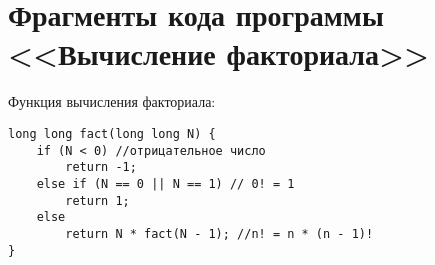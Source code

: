 \appendix
\section{Фрагменты кода программы <<Вычисление факториала>>}
\label{app:factorial}
Функция вычисления факториала:

\begin{verbatim}
long long fact(long long N) {
	if (N < 0) //отрицательное число
		return -1;
	else if (N == 0 || N == 1) // 0! = 1
		return 1;
	else
		return N * fact(N - 1); //n! = n * (n - 1)!
}
\end{verbatim}